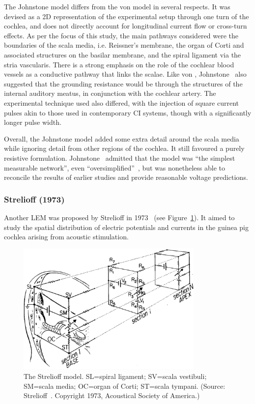 The Johnstone model differs from the von \bekesy{} model in several respects. It
was devised as a 2D representation of the experimental setup through one turn of
the cochlea, and does not directly account for longitudinal current flow or
cross-turn effects. As per the focus of this study, the main pathways considered
were the boundaries of the scala media, i.e. Reissner's membrane, the organ of
Corti and associated structures on the basilar membrane, and the spiral ligament
via the stria vascularis. There is a strong emphasis on the role of the cochlear
blood vessels as a conductive pathway that links the scalae. Like von \bekesy,
Johnstone~\etal{} also suggested that the grounding resistance would be through
the structures of the internal auditory meatus, in conjunction with the cochlear
artery. The experimental technique used also differed, with the injection of
square current pulses akin to those used in contemporary CI systems, though with
a significantly longer pulse width.

Overall, the Johnstone model added some extra detail around the scala media
while ignoring detail from other regions of the cochlea. It still favoured a
purely resistive formulation. Johnstone~\etal{} admitted that the model was
``the simplest measurable network'', even
``oversimplified''~\cite{johnstone1966}, but was nonetheless able to reconcile
the results of earlier studies and provide reasonable voltage predictions.

\subsubsection{Strelioff (1973)}

Another LEM was proposed by Strelioff in 1973~\cite{strelioff1973} (see
Figure~\ref{fig:model_strelioff}). It aimed to study the spatial distribution of
electric potentials and currents in the guinea pig cochlea arising from acoustic
stimulation.

\begin{figure}
	\centering
	\includegraphics[height=6.5cm]{Background/strelioff}
	\caption[The Strelioff model]{The Strelioff model. SL=spiral ligament; SV=scala
	vestibuli; SM=scala media; OC=organ of Corti; ST=scala tympani. (Source:
	Strelioff~\cite{strelioff1973}. Copyright \textcopyright{} 1973,
	Acoustical Society of America.)}
	\label{fig:model_strelioff}
\end{figure}

